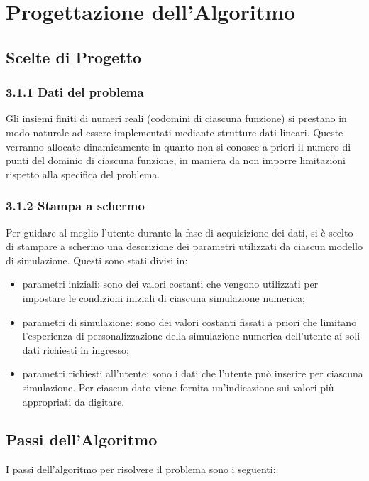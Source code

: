 \section{Progettazione dell'Algoritmo}
\subsection{Scelte di Progetto}

\subsubsection*{3.1.1 Dati del problema}
Gli insiemi finiti di numeri reali (codomini di ciascuna funzione) si prestano in modo naturale ad essere implementati mediante strutture dati lineari. Queste verranno allocate dinamicamente in quanto non si conosce a priori il numero di punti del dominio di ciascuna funzione, in maniera da non imporre limitazioni rispetto alla specifica del problema.

\subsubsection*{3.1.2 Stampa a schermo}
Per guidare al meglio l'utente durante la fase di acquisizione dei dati, si è scelto di stampare a schermo una descrizione dei parametri utilizzati da ciascun modello di simulazione. Questi sono stati divisi in:
\begin{itemize}
\item parametri iniziali: sono dei valori costanti che vengono utilizzati per impostare le condizioni iniziali di ciascuna simulazione numerica;
\item parametri di simulazione: sono dei valori costanti fissati a priori che limitano l'esperienza di personalizzazione della simulazione numerica dell'utente ai soli dati richiesti in ingresso;
\item parametri richiesti all'utente: sono i dati che l'utente può inserire per ciascuna simulazione. Per ciascun dato viene fornita un'indicazione sui valori più appropriati da digitare. 
\end{itemize} 


\subsection{Passi dell'Algoritmo}
I passi dell'algoritmo per risolvere il problema sono i seguenti:

